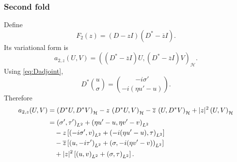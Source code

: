 \documentclass[12pt,a4paper]{article}
\newcommand{\ip}[2]{\left(#1,#2\right)_{L^2}}
\newcommand{\IP}[2]{\left(#1,#2\right)_{\mathcal H}}
\begin{document}
\subsubsection*{Second fold}

Define
\begin{equation}
    F_{2}(z)
    =(D-zI)(D^*-\overline z I).
\end{equation}
Its variational form is
\begin{equation}
    a_{2,z}(U,V)
    =\IP{(D^*-\overline z I)U}
          {(D^*-\overline z I)V}.
\end{equation}
Using \eqref{eq:Dadjoint},
\[
    D^*\binom{u}{\sigma}
    =\binom{-i\sigma'}{-i(\eta u'-u)}.
\]
Therefore
\begin{align}
    a_{2,z}(U,V)
    &=\IP{D^*U}{D^*V}
      -z\,\IP{D^*U}{V}
      -\overline z\,\IP{U}{D^*V}
      +|z|^2\IP{U}{V}\\[0.3em]
    &=\ip{\sigma'}{\tau'}
      +\ip{\eta u'-u}{\eta v'-v}\notag\\
    &\quad
      -z\left[
        \ip{-i\sigma'}{v}
        +\ip{-i(\eta u'-u)}{\tau}
      \right]\notag\\
    &\quad
      -\overline z\left[
        \ip{u}{-i\tau'}
        +\ip{\sigma}{-i(\eta v'-v)}
      \right]\notag\\
    &\quad
      +|z|^2\left[
        \ip{u}{v}+\ip{\sigma}{\tau}
      \right].
    \label{eq:diracfold2}
\end{align}
\end{document}
